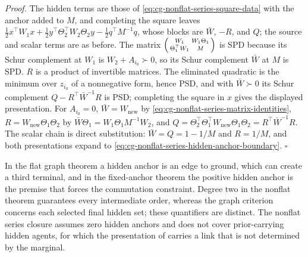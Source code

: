 \noindent\emph{Proof.}
The hidden terms are those of \eqref{eq:cg-nonflat-series-square-data} with the
anchor added to \(M\), and completing the square leaves
\(\frac12x^\top W_1x+\frac12y^\top\Theta_2^\top W_2\Theta_2y-\frac12q^\top M^{-1}q\),
whose blocks are \(\bar W\), \(-R\), and \(Q\); the source and scalar terms are as
before. The matrix
\(\begin{psmallmatrix}W_1&W_1\Theta_1\\\Theta_1^\top W_1&M\end{psmallmatrix}\)
is SPD because its Schur complement at \(W_1\) is \(W_2+A_{i_0}\succ0\), so its
Schur complement \(\bar W\) at \(M\) is SPD. \(R\) is a product of invertible
matrices. The eliminated quadratic is the minimum over \(z_{i_0}\) of a
nonnegative form, hence PSD, and with \(\bar W\succ0\) its Schur complement
\(Q-R^\top \bar W^{-1}R\) is PSD; completing the square in \(x\) gives the displayed
presentation. For \(A_{i_0}=0\), \(\bar W=W_{\mathrm{new}}\) by
\eqref{eq:cg-nonflat-series-matrix-identities}, \(R=W_{\mathrm{new}}\Theta_1\Theta_2\)
by \(\bar W\Theta_1=W_1\Theta_1M^{-1}W_2\), and \(Q=\Theta_2^\top\Theta_1^\top
W_{\mathrm{new}}\Theta_1\Theta_2=R^\top \bar W^{-1}R\). The scalar chain is direct
substitution: \(\bar W=Q=1-1/M\) and \(R=1/M\), and both presentations expand to
\eqref{eq:cg-nonflat-series-hidden-anchor-boundary}. \(\square\)

In the flat graph theorem a hidden anchor is an edge to ground, which can
create a third terminal, and in the fixed-anchor theorem the positive hidden
anchor is the premise that forces the commutation constraint. Degree two in the
nonflat theorem guarantees every intermediate order, whereas the graph criterion
concerns each selected final hidden set; these quantifiers are distinct. The
nonflat series closure assumes zero hidden anchors and does not cover
prior-carrying hidden agents, for which the presentation of
 carries a link that is not determined by
the marginal.

